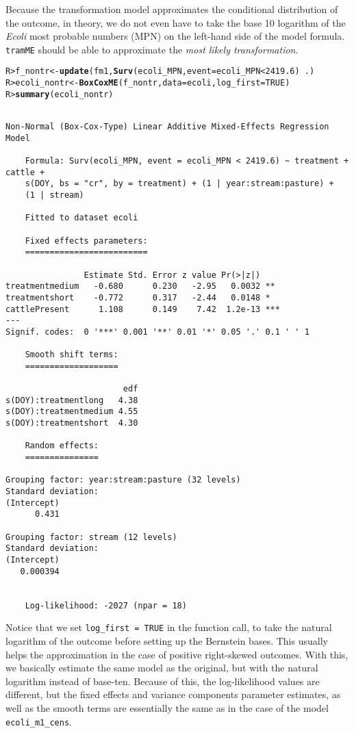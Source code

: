 \documentclass[11pt]{article}\usepackage[]{graphicx}\usepackage{xcolor}
\makeatletter
\newcommand{\hlnum}[1]{\textcolor[rgb]{0.686,0.059,0.569}{#1}}%
\newcommand{\hlopt}[1]{\textcolor[rgb]{0,0,0}{#1}}%
\newcommand{\hlstd}[1]{\textcolor[rgb]{0.345,0.345,0.345}{#1}}%
\newcommand{\hlkwb}[1]{\textcolor[rgb]{0.69,0.353,0.396}{#1}}%
\newcommand{\hlkwc}[1]{\textcolor[rgb]{0.333,0.667,0.333}{#1}}%
\newcommand{\hlkwd}[1]{\textcolor[rgb]{0.737,0.353,0.396}{\textbf{#1}}}%
\newenvironment{kframe}{%
 \def\at@end@of@kframe{}%
 \ifinner\ifhmode%
  \def\at@end@of@kframe{\end{minipage}}%
  \begin{minipage}{\columnwidth}%
 \fi\fi%
 \def\FrameCommand##1{\hskip\@totalleftmargin \hskip-\fboxsep
 \colorbox{shadecolor}{##1}\hskip-\fboxsep
     \hskip-\linewidth \hskip-\@totalleftmargin \hskip\columnwidth}%
 \MakeFramed {\advance\hsize-\width
   \@totalleftmargin\z@ \linewidth\hsize
   \@setminipage}}%
 {\par\unskip\endMakeFramed%
 \at@end@of@kframe}
\newenvironment{knitrout}{}{} %
\newcommand{\pkg}[1]{\texttt{#1}}
\newcommand{\0}{{\mathbf{0}}}
\makeatother
\begin{document}
Because the transformation model approximates
the conditional distribution of the outcome,
in theory,
we do not even have to take the base 10 logarithm
of the \emph{Ecoli} most probable numbers (MPN)
on the left-hand side of the model formula.
\pkg{tramME} should be able to approximate the
\emph{most likely transformation}.
%
\begin{knitrout}\small
{}\color{fgcolor}\begin{kframe}
\begin{alltt}
\hlstd{R> }\hlstd{f_nontr} \hlkwb{<-} \hlkwd{update}\hlstd{(fm1,} \hlkwd{Surv}\hlstd{(ecoli_MPN,} \hlkwc{event} \hlstd{= ecoli_MPN} \hlopt{<} \hlnum{2419.6}\hlstd{)} \hlopt{~} \hlstd{.)}
\hlstd{R> }\hlstd{ecoli_nontr} \hlkwb{<-} \hlkwd{BoxCoxME}\hlstd{(f_nontr,} \hlkwc{data} \hlstd{= ecoli,} \hlkwc{log_first} \hlstd{=} \hlnum{TRUE}\hlstd{)}
\hlstd{R> }\hlkwd{summary}\hlstd{(ecoli_nontr)}
\end{alltt}
\begin{verbatim}

Non-Normal (Box-Cox-Type) Linear Additive Mixed-Effects Regression Model

	Formula: Surv(ecoli_MPN, event = ecoli_MPN < 2419.6) ~ treatment + cattle + 
    s(DOY, bs = "cr", by = treatment) + (1 | year:stream:pasture) + 
    (1 | stream)

	Fitted to dataset ecoli  

	Fixed effects parameters:
	=========================

                Estimate Std. Error z value Pr(>|z|)    
treatmentmedium   -0.680      0.230   -2.95   0.0032 ** 
treatmentshort    -0.772      0.317   -2.44   0.0148 *  
cattlePresent      1.108      0.149    7.42  1.2e-13 ***
---
Signif. codes:  0 '***' 0.001 '**' 0.01 '*' 0.05 '.' 0.1 ' ' 1

	Smooth shift terms:
	===================

                        edf
s(DOY):treatmentlong   4.38
s(DOY):treatmentmedium 4.55
s(DOY):treatmentshort  4.30

	Random effects:
	===============

Grouping factor: year:stream:pasture (32 levels)
Standard deviation:
(Intercept) 
      0.431 

Grouping factor: stream (12 levels)
Standard deviation:
(Intercept) 
   0.000394 


	Log-likelihood: -2027 (npar = 18)
\end{verbatim}
\end{kframe}
\end{knitrout}
%
Notice that we set \texttt{log\_first = TRUE} in the function call,
to take the natural logarithm of the outcome
before setting up the Bernstein bases.
This usually helps the approximation in the case of positive right-skewed outcomes.
With this, we basically estimate the same model as the original,
but with the natural logarithm instead of base-ten.
Because of this, the log-likelihood values are different,
but the fixed effects and variance components parameter estimates,
as well as the smooth terms are essentially the same as
in the case of the model \texttt{ecoli\_m1\_cens}.
\end{document}
